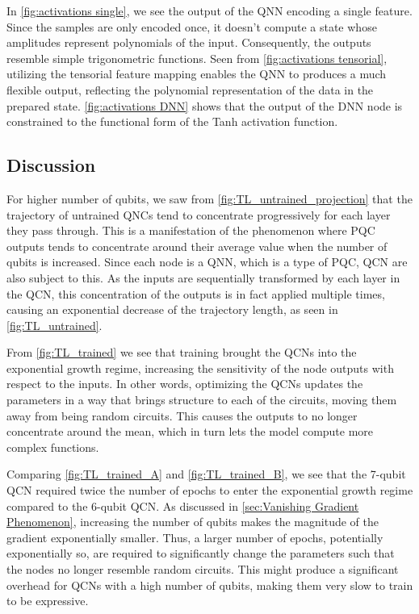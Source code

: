 In \autoref{fig:activations single}, we see the output of the QNN encoding a single feature. Since the samples are only encoded once, it doesn't compute a state whose amplitudes represent polynomials of the input. Consequently, the outputs resemble simple trigonometric functions. Seen from \autoref{fig:activations tensorial}, utilizing the tensorial feature mapping enables the QNN to produces a much flexible output, reflecting the polynomial representation of the data in the prepared state. \autoref{fig:activations DNN} shows that the output of the DNN node is constrained to the functional form of the Tanh activation function.   




\subsection{Discussion}\label{sec:Discussion Expressivity}

For higher number of qubits, we saw from \autoref{fig:TL_untrained_projection} that the trajectory of untrained QNCs tend to concentrate progressively for each layer they pass through. This is a manifestation of the phenomenon where PQC outputs tends to concentrate around their average value when the number of qubits is increased. Since each node is a QNN, which is a type of PQC, QCN are also subject to this. As the inputs are sequentially transformed by each layer in the QCN, this concentration of the outputs is in fact applied multiple times, causing an exponential decrease of the trajectory length, as seen in \autoref{fig:TL_untrained}.

From \autoref{fig:TL_trained} we see that training brought the QCNs into the exponential growth regime, increasing the sensitivity of the node outputs with respect to the inputs. In other words, optimizing the QCNs updates the parameters in a way that brings structure to each of the circuits, moving them away from being random circuits. This causes the outputs to no longer concentrate around the mean, which in turn lets the model compute more complex functions. 

Comparing \autoref{fig:TL_trained_A} and \autoref{fig:TL_trained_B}, we see that the 7-qubit QCN required twice the number of epochs to enter the exponential growth regime compared to the 6-qubit QCN. As discussed in \autoref{sec:Vanishing Gradient Phenomenon}, increasing the number of qubits makes the magnitude of the gradient exponentially smaller. Thus, a larger number of epochs, potentially exponentially so, are required to significantly change the parameters such that the nodes no longer resemble random circuits. This might produce a significant overhead for QCNs with a high number of qubits, making them very slow to train to be expressive.  

